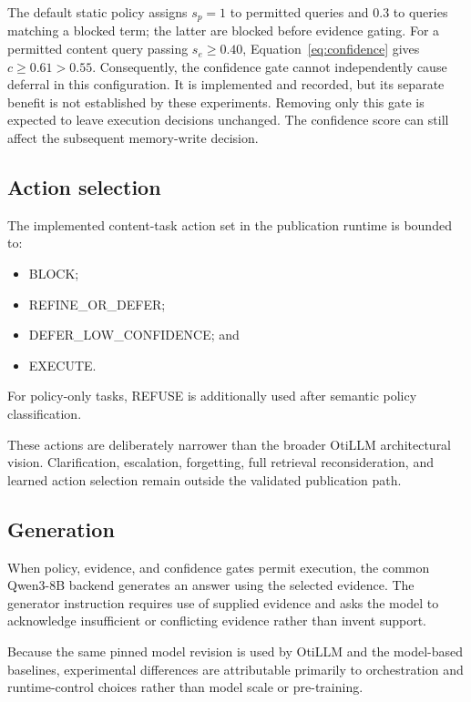 \documentclass[manuscript, screen, review]{jair}
\begin{document}
The default static policy assigns $s_p=1$ to permitted queries and $0.3$ to
queries matching a blocked term; the latter are blocked before evidence gating.
For a permitted content query passing $s_e\geq0.40$, Equation~\ref{eq:confidence}
gives $c\geq0.61>0.55$. Consequently, the confidence gate cannot independently
cause deferral in this configuration. It is implemented and recorded, but its
separate benefit is not established by these experiments. Removing only this
gate is expected to leave execution decisions unchanged. The confidence score
can still affect the subsequent memory-write decision.

\subsection{Action selection}

The implemented content-task action set in the publication
runtime is bounded to:

\begin{itemize}
\item BLOCK;
\item REFINE\_OR\_DEFER;
\item DEFER\_LOW\_CONFIDENCE; and
\item EXECUTE.
\end{itemize}

For policy-only tasks, REFUSE is additionally used after semantic policy
classification.

These actions are deliberately narrower than the broader OtiLLM architectural
vision. Clarification, escalation, forgetting, full retrieval reconsideration,
and learned action selection remain outside the validated publication path.

\subsection{Generation}

When policy, evidence, and confidence gates permit execution, the common
Qwen3-8B backend generates an answer using the selected evidence. The generator
instruction requires use of supplied evidence and asks the model to acknowledge
insufficient or conflicting evidence rather than invent support.

Because the same pinned model revision is used by OtiLLM and the model-based
baselines, experimental differences are attributable primarily to orchestration
and runtime-control choices rather than model scale or pre-training.
\end{document}
